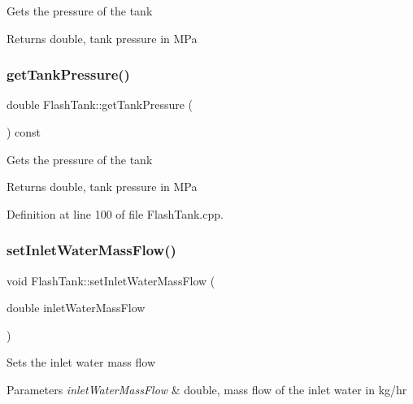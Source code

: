 Gets the pressure of the tank \begin{DoxyReturn}{Returns}
double, tank pressure in M\+Pa 
\end{DoxyReturn}
\mbox{\label{class_flash_tank_af5d4f0bf7babe61120e1e4452594e1af}} 
\subsubsection{\texorpdfstring{get\+Tank\+Pressure()}{getTankPressure()}\hspace{0.1cm}{\footnotesize\ttfamily [3/3]}}
{\footnotesize\ttfamily double Flash\+Tank\+::get\+Tank\+Pressure (\begin{DoxyParamCaption}{ }\end{DoxyParamCaption}) const}

Gets the pressure of the tank \begin{DoxyReturn}{Returns}
double, tank pressure in M\+Pa 
\end{DoxyReturn}


Definition at line 100 of file Flash\+Tank.\+cpp.

\mbox{\label{class_flash_tank_a2bcbd92d39ef3c760bdd65066ba3d34a}} 
\subsubsection{\texorpdfstring{set\+Inlet\+Water\+Mass\+Flow()}{setInletWaterMassFlow()}\hspace{0.1cm}{\footnotesize\ttfamily [1/3]}}
{\footnotesize\ttfamily void Flash\+Tank\+::set\+Inlet\+Water\+Mass\+Flow (\begin{DoxyParamCaption}\item[{double}]{inlet\+Water\+Mass\+Flow }\end{DoxyParamCaption})}

Sets the inlet water mass flow 
\begin{DoxyParams}{Parameters}
{\em inlet\+Water\+Mass\+Flow} & double, mass flow of the inlet water in kg/hr \\
\hline
\end{DoxyParams}
\mbox{\label{class_flash_tank_a2bcbd92d39ef3c760bdd65066ba3d34a}} 
